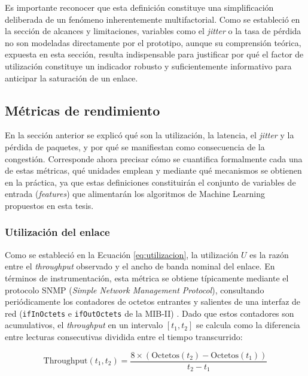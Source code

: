 \documentclass[12pt]{report}
\begin{document}
Es importante reconocer que esta definición constituye una simplificación deliberada de un fenómeno inherentemente multifactorial. Como se estableció en la sección de alcances y limitaciones, variables como el \textit{jitter} o la tasa de pérdida no son modeladas directamente por el prototipo, aunque su comprensión teórica, expuesta en esta sección, resulta indispensable para justificar por 
qué el factor de utilización constituye un indicador robusto y suficientemente informativo para anticipar la saturación de un enlace.

\subsection{Métricas de rendimiento}
\label{sec:metricas}

En la sección anterior se explicó qué son la utilización, la latencia, el \textit{jitter} y la pérdida de paquetes, y por qué se manifiestan como consecuencia de la congestión. Corresponde ahora precisar cómo se cuantifica formalmente cada una de estas métricas, qué unidades emplean y mediante qué mecanismos se obtienen en la práctica, ya que estas definiciones constituirán el conjunto de 
variables de entrada (\textit{features}) que alimentarán los algoritmos de Machine Learning propuestos en esta tesis.

\subsubsection*{Utilización del enlace}

Como se estableció en la Ecuación \ref{eq:utilizacion}, la utilización $U$ es la razón entre el \textit{throughput} observado y el ancho de banda nominal del enlace. En términos de instrumentación, esta métrica se obtiene típicamente mediante el protocolo SNMP (\textit{Simple Network Management Protocol}), consultando periódicamente los contadores de octetos entrantes y salientes de una 
interfaz de red (\texttt{ifInOctets} e \texttt{ifOutOctets} de la MIB-II) \cite{tanenbaum2011}. Dado que estos contadores son acumulativos, el \textit{throughput} en un intervalo $[t_1, t_2]$ se calcula como la diferencia entre lecturas consecutivas dividida entre el tiempo transcurrido:

\begin{equation}
    \text{Throughput}(t_1, t_2) = \frac{8 \times \left(\text{Octetos}(t_2) - \text{Octetos}(t_1)\right)}{t_2 - t_1}
    \label{eq:throughput}
\end{equation}
\end{document}
